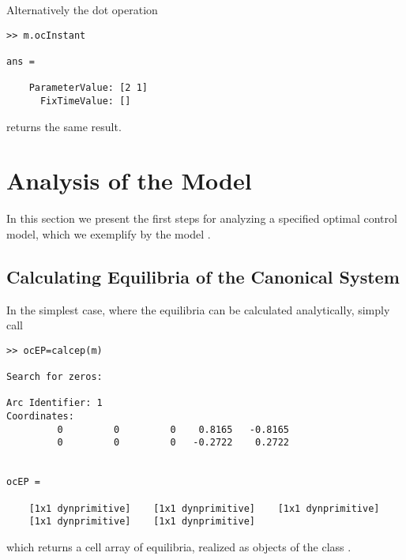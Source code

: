 \begin{remark}
Alternatively the dot operation 
\begin{lstlisting}
>> m.ocInstant

ans = 

    ParameterValue: [2 1]
      FixTimeValue: []
\end{lstlisting}
returns the same result.
\end{remark}

\section{Analysis of the Model}
\label{sec:analysis_model}

In this section we present the first steps for analyzing a specified optimal control model, which we exemplify by the model \MOM.
\subsection{Calculating Equilibria of the Canonical System}
In the simplest case, where the equilibria can be calculated analytically, simply call 
\begin{lstlisting}
>> ocEP=calcep(m)

Search for zeros: 

Arc Identifier: 1
Coordinates:
         0         0         0    0.8165   -0.8165
         0         0         0   -0.2722    0.2722


ocEP = 

    [1x1 dynprimitive]    [1x1 dynprimitive]    [1x1 dynprimitive]
    [1x1 dynprimitive]    [1x1 dynprimitive]
\end{lstlisting}
which returns a cell array of equilibria, realized as objects of the class \dynprimitive. 

